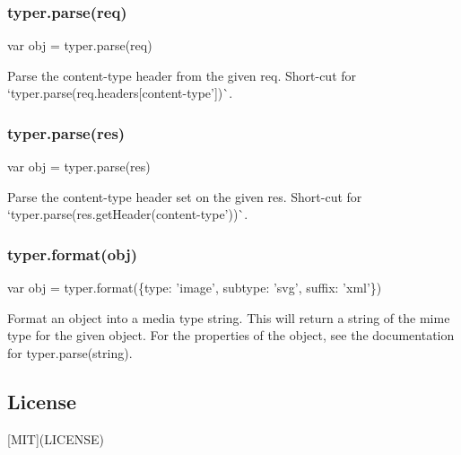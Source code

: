 \subsubsection*{typer.\+parse(req)}


\begin{DoxyCode}
var obj = typer.parse(req)
\end{DoxyCode}


Parse the {\ttfamily content-\/type} header from the given {\ttfamily req}. Short-\/cut for `typer.\+parse(req.\+headers\mbox{[}\textquotesingle{}content-\/type'\mbox{]})\`{}.

\subsubsection*{typer.\+parse(res)}


\begin{DoxyCode}
var obj = typer.parse(res)
\end{DoxyCode}


Parse the {\ttfamily content-\/type} header set on the given {\ttfamily res}. Short-\/cut for `typer.\+parse(res.\+get\+Header(\textquotesingle{}content-\/type'))\`{}.

\subsubsection*{typer.\+format(obj)}


\begin{DoxyCode}
var obj = typer.format(\{type: 'image', subtype: 'svg', suffix: 'xml'\})
\end{DoxyCode}


Format an object into a media type string. This will return a string of the mime type for the given object. For the properties of the object, see the documentation for {\ttfamily typer.\+parse(string)}.

\subsection*{License}

\mbox{[}M\+IT\mbox{]}(L\+I\+C\+E\+N\+SE) 